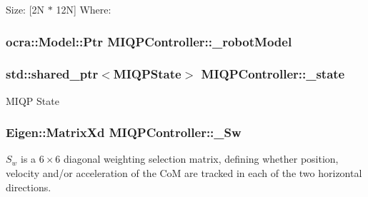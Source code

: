 \-Size\-: \mbox{[}2\-N $\ast$ 12\-N\mbox{]} \-Where\-: \[ \] \hypertarget{classMIQPController_a03735ecec3242cdfc9bf8a443c561724}{
\subsubsection[{\-\_\-robot\-Model}]{\setlength{\rightskip}{0pt plus 5cm}ocra\-::\-Model\-::\-Ptr {\bf \-M\-I\-Q\-P\-Controller\-::\-\_\-robot\-Model}}}\label{classMIQPController_a03735ecec3242cdfc9bf8a443c561724}
\hypertarget{classMIQPController_adc70be859da53c202bc0e0c84cc71917}{
\subsubsection[{\-\_\-state}]{\setlength{\rightskip}{0pt plus 5cm}std\-::shared\-\_\-ptr$<${\bf \-M\-I\-Q\-P\-State}$>$ {\bf \-M\-I\-Q\-P\-Controller\-::\-\_\-state}}}\label{classMIQPController_adc70be859da53c202bc0e0c84cc71917}
\-M\-I\-Q\-P \-State \hypertarget{classMIQPController_ada92fc35065a11b889019f2948c1888d}{
\subsubsection[{\-\_\-\-Sw}]{\setlength{\rightskip}{0pt plus 5cm}\-Eigen\-::\-Matrix\-Xd {\bf \-M\-I\-Q\-P\-Controller\-::\-\_\-\-Sw}}}\label{classMIQPController_ada92fc35065a11b889019f2948c1888d}
$S_w$ is a $6\times6$ diagonal weighting selection matrix, defining whether position, velocity and/or acceleration of the \-Co\-M are tracked in each of the two horizontal directions.

